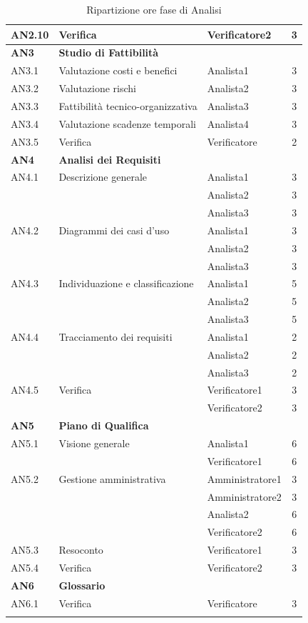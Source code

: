 \begin{longtable}{|l|l|l|c|}
    	{AN2.10} & {Verifica} & Verificatore2  & 3 \\
    \hline
    \textbf{AN3} & \textbf{Studio di Fattibilità}  & &  \\
      \hline
      	{AN3.1} & {Valutazione costi e benefici} & Analista1  & 3 \\
      	\hline
      	{AN3.2} & {Valutazione rischi} & Analista2 & 3\\
      	\hline
      	{AN3.3} & {Fattibilità tecnico-organizzativa} & Analista3  & 3 \\
      	\hline
      	{AN3.4} & {Valutazione scadenze temporali} & Analista4  & 3 \\
      	\hline
      	{AN3.5} & {Verifica} & Verificatore  & 2 \\
      \hline
      \textbf{AN4} & \textbf{Analisi dei Requisiti} & &  \\
         \hline
         {AN4.1} & {Descrizione generale} & Analista1  &  3\\
         & & Analista2 & 3\\
         & & Analista3 & 3\\
         \hline
         {AN4.2} & {Diagrammi dei casi d'uso} & Analista1  &  3\\
         & & Analista2 & 3\\
         & & Analista3 & 3\\
         \hline
         {AN4.3} & {Individuazione e classificazione} & Analista1  &  5\\
         & & Analista2 & 5\\
         & & Analista3 & 5\\
         \hline
         {AN4.4} & {Tracciamento dei requisiti} & Analista1  &  2\\
         & & Analista2 & 2\\
         & & Analista3 & 2\\
         \hline
         {AN4.5} & {Verifica} & Verificatore1  &  3\\
         & & Verificatore2 & 3\\
     \hline
     \textbf{AN5} & \textbf{Piano di Qualifica} & &  \\
         \hline
         {AN5.1} & {Visione generale} & Analista1 &  6 \\
         & & Verificatore1 & 6\\
         \hline
         {AN5.2} & {Gestione amministrativa} & Amministratore1  &  3\\
         & & Amministratore2 & 3\\
         & & Analista2 & 6\\
         & & Verificatore2 & 6\\
         \hline
         {AN5.3} & {Resoconto} & Verificatore1 &  3\\
         \hline
         {AN5.4} & {Verifica} & Verificatore2 &  3 \\
     \hline
     \textbf{AN6} & \textbf{Glossario} & &  \\
         \hline
         {AN6.1} & {Verifica} & Verificatore &  3 \\
         \hline
     \caption{Ripartizione ore fase di Analisi}
\end{longtable}
\egroup
  
